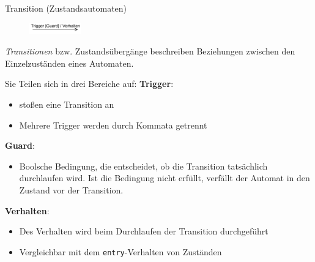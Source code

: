 \begin{defi}{Transition (Zustandsautomaten)}
    \begin{figure}
        \centering
        \includegraphics[width=0.2\textwidth]{includes/figures/defi_diagrams_state_transaktion.pdf}
    \end{figure}
    \emph{Transitionen} bzw. Zustandsübergänge beschreiben Beziehungen zwischen den Einzelzuständen eines Automaten.

    Sie Teilen sich in drei Bereiche auf:
    \textbf{Trigger}:
    \begin{itemize}
        \item stoßen eine Transition an
        \item Mehrere Trigger werden durch Kommata getrennt
    \end{itemize}

    \textbf{Guard}:
    \begin{itemize}
        \item Boolsche Bedingung, die entscheidet, ob die Transition tatsächlich durchlaufen wird.
              Ist die Bedingung nicht erfüllt, verfällt der Automat in den Zustand vor der Transition.
    \end{itemize}

    \textbf{Verhalten}:
    \begin{itemize}
        \item Des Verhalten wird beim Durchlaufen der Transition durchgeführt
        \item Vergleichbar mit dem \texttt{entry}-Verhalten von Zuständen
    \end{itemize}
\end{defi}

